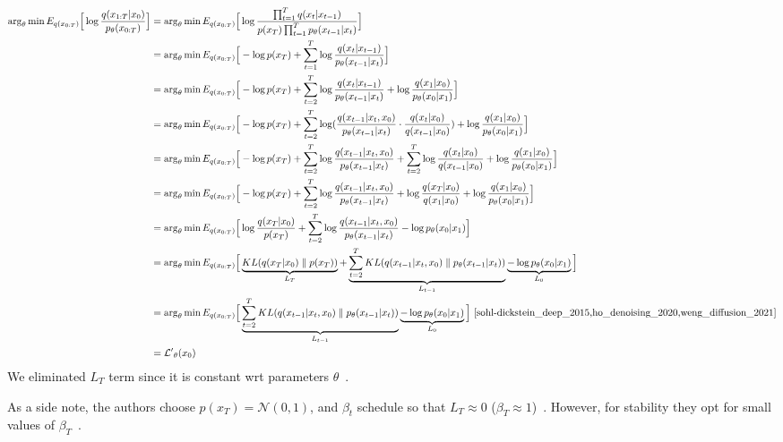 \documentclass{article}
\numberwithin{equation}{subsection}
\begin{document}
\begin{align}
\arg_\theta \min E_{q(x_{0:T})}\Big[\log\frac{q(x_{1:T}|x_0)}{p_\theta(x_{0:T})}\Big] &= \arg_\theta \min E_{q(x_{0:T})}\Big[ \log\frac{\prod_{t=1}^T q(x_t|x_{t-1})}{ p(x_T) \prod_{t=1}^T p_\theta(x_{t-1} |x_t) }\Big] \\
&= \arg_\theta \min E_{q(x_{0:T})}\Big[ -\log p(x_T) + \sum_{t=1}^T \log \frac{q(x_t|x_{t-1})}{p_\theta(x_{t-1} |x_t)}\Big] \\
&= \arg_\theta \min E_{q(x_{0:T})}\Big[ -\log p(x_T) + \sum_{t=2}^T \log \frac{q(x_t|x_{t-1})}{p_\theta(x_{t-1} |x_t)} + \log\frac{q(x_1 |x_0)}{p_\theta(x_0 |x_1)}\Big]\\
&= \arg_\theta \min E_{q(x_{0:T})}\Big[ -\log p(x_T) + \sum_{t=2}^T \log ( \frac{q(x_{t-1} |x_t, x_0)}{p_\theta(x_{t-1} |x_t)}\cdot \frac{q(x_t |x_0)}{q(x_{t-1}|x_0)} ) + \log \frac{q(x_1 |x_0)}{p_\theta(x_0 |x_1)} \Big]\label{x0cond}\\
&= \arg_\theta \min E_{q(x_{0:T})}\Big[ -\log p(x_T) + \sum_{t=2}^T \log \frac{q(x_{t-1} |x_t, x_0)}{p_\theta(x_{t-1} |x_t)} + \sum_{t=2}^T \log \frac{q(x_t |x_0)}{q(x_{t-1} |x_0)} + \log\frac{q(x_1 |x_0)}{p_\theta(x_0 |x_1)}\Big] \\
&= \arg_\theta \min E_{q(x_{0:T})}\Big[-\log p(x_T) + \sum_{t=2}^T \log \frac{q(x_{t-1} |x_t, x_0)}{p_\theta(x_{t-1} |x_t)} + \log\frac{q(x_T |x_0)}{q(x_1 |x_0)} + \log \frac{q(x_1 |x_0)}{p_\theta(x_0 |x_1)}\Big]\\
&= \arg_\theta \min E_{q(x_{0:T})}\Big[\log\frac{q(x_T |x_0)}{p(x_T)} + \sum_{t=2}^T \log \frac{q(x_{t-1} |x_t, x_0)}{p_\theta(x_{t-1} |x_t)} - \log p_\theta(x_0 |x_1)\Big] \\
&= \arg_\theta \min E_{q(x_{0:T})}\Big[\underbrace{KL(q(x_T |x_0) \parallel p(x_T))}_{L_T} + \underbrace{\sum_{t=2}^T KL(q(x_{t-1} |x_t, x_0) \parallel p_\theta(x_{t-1} |x_t))}_{L_{t-1}} \underbrace{- \log p_\theta(x_0 |x_1)}_{L_0}\Big]\\
&= \arg_\theta \min E_{q(x_{0:T})}\Big[\underbrace{\sum_{t=2}^T KL(q(x_{t-1} |x_t, x_0) \parallel p_\theta(x_{t-1} |x_t))}_{L_{t-1}} \underbrace{- \log p_\theta(x_0 |x_1)}_{L_0}\Big]~\cite{sohl-dickstein_deep_2015,ho_denoising_2020,weng_diffusion_2021}\\
&= \mathcal{L'}_\theta(x_0)
\end{align}
We eliminated $L_T$ term since it is constant wrt parameters $\theta$~\cite{weng_diffusion_2021}. 

As a side note, the authors choose $p(x_T)=\mathcal{N}(0,1)$, and $\beta_t$ schedule so that $L_T \approx 0$ ($\beta_T \approx 1$)~\cite{ho_denoising_2020}. However, for stability they opt for small values of $\beta_T$~\cite{sohl-dickstein_deep_2015, ho_denoising_2020}.
\end{document}

